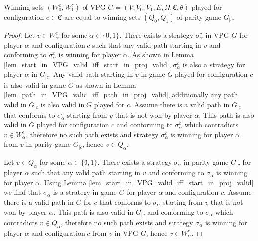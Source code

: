 \begin{theorem}
	\label{the_winning_set_is_equal_to_proj_winning_set}
	Winning sets $(W_0^c, W_1^c)$ of VPG $G = (V,V_0,V_1,E,\Omega,\mathfrak{C},\theta)$ played for configuration $c \in \mathfrak{C}$ are equal to winning sets $(Q_0,Q_1)$ of parity game $G_{|c}$.
	\begin{proof}
		Let $v \in W_\alpha^c$ for some $\alpha \in \{0,1\}$. There exists a strategy $\sigma_\alpha^c$ in VPG $G$ for player $\alpha$ and configuration $c$ such that any valid path starting in $v$ and conforming to $\sigma_\alpha^c$ is winning for player $\alpha$. As shown in Lemma \ref{lem_start_in_VPG_valid_iff_start_in_proj_valid}, $\sigma_\alpha^c$ is also a strategy for player $\alpha$ in $G_{|c}$. Any valid path starting in $v$ in game $G$ played for configuration $c$ is also valid in game $G$ as shown in Lemma \ref{lem_path_in_VPG_valid_iff_path_in_proj_valid}, additionally any path valid in $G_{|c}$ is also valid in $G$ played for $c$. Assume there is a valid path in $G_{|c}$ that conforms to $\sigma_\alpha^c$ starting from $v$ that is not won by player $\alpha$. This path is also valid in $G$ played for configuration $c$ and conforming to $\sigma_\alpha^c$ which contradicts $v \in W_\alpha^c$, therefore no such path exists and strategy $\sigma_\alpha^c$ is winning for player $\alpha$ from $v$ in parity game $G_{|c}$, hence $v \in Q_\alpha$.
		
		Let $v \in Q_\alpha$ for some $\alpha \in \{0,1\}$. There exists a strategy $\sigma_\alpha$ in parity game $G_{|c}$ for player $\alpha$ such that any valid path starting in $v$ and conforming to $\sigma_\alpha$ is winning for player $\alpha$. Using Lemma \ref{lem_start_in_VPG_valid_iff_start_in_proj_valid} we find that $\sigma_\alpha$ is a strategy in game $G$ for player $\alpha$ and configuration $c$. Assume there is a valid path in $G$ for $c$ that conforms to $\sigma_\alpha$ starting from $v$ that is not won by player $\alpha$. This path is also valid in $G_{|c}$ and conforming to $\sigma_\alpha$ which contradicts $v \in Q_\alpha$, therefore no such path exists and strategy $\sigma_\alpha$ is winning for player $\alpha$ and configuration $c$ from $v$ in VPG $G$, hence $v \in W_\alpha^c$.
	\end{proof}
\end{theorem}

